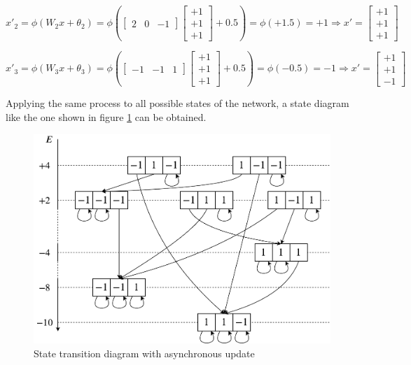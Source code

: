 \documentclass[letterpaper,headings=standardclasses]{scrartcl}
\begin{document}
\begin{itemize}
$$ x'_{2} = \phi(W_2 x + \theta_2) = \phi \left( \left[ \begin{matrix} 2 & 0 & -1 \end{matrix} \right] \left[ \begin{matrix} +1 \\ +1 \\ +1 \end{matrix} \right] + 0.5 \right) = \phi \left( +1.5 \right) = +1 \Rightarrow x' = \left[ \begin{matrix} +1 \\ +1 \\ +1 \end{matrix} \right] $$

$$ x'_{3} = \phi(W_3 x + \theta_3) = \phi \left( \left[ \begin{matrix} -1 & -1 & 1 \end{matrix} \right] \left[ \begin{matrix} +1 \\ +1 \\ +1 \end{matrix} \right] + 0.5 \right) = \phi \left( -0.5 \right) = -1 \Rightarrow x' = \left[ \begin{matrix} +1 \\ +1 \\ -1 \end{matrix} \right] $$
\end{itemize}

Applying the same process to all possible states of the network, a state diagram like the one shown in figure \ref{async} can be obtained.

\begin{figure}[h]
    \centering
    \includegraphics[width=0.7\linewidth]{async.pdf}
    \caption{State transition diagram with asynchronous update}
    \label{async}
\end{figure}
\end{document}
